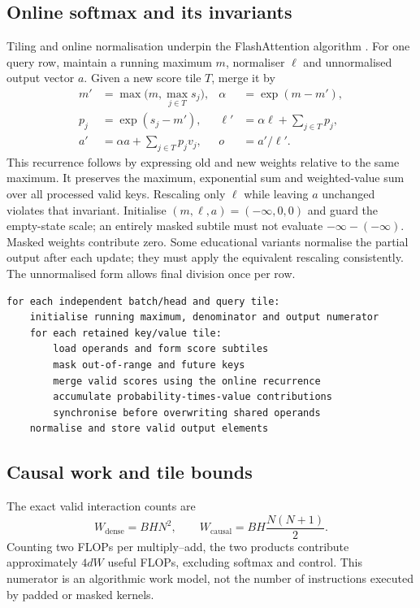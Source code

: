 \documentclass[11pt,a4paper]{article}
\begin{document}
\subsection{Online softmax and its invariants}
Tiling and online normalisation underpin the FlashAttention algorithm
\cite{flashattention,online}. For one query row, maintain a running maximum $m$,
normaliser $\ell$ and unnormalised output vector $a$. Given a new score tile
$T$, merge it by
\begin{align}
 m'&=\max\bigl(m,\max_{j\in T}s_j\bigr), &
 \alpha&=\exp(m-m'),\nonumber\\
 p_j&=\exp(s_j-m'), &
 \ell'&=\alpha\ell+\sum_{j\in T}p_j,\label{eq:online}\\
 a'&=\alpha a+\sum_{j\in T}p_jv_j, &
 o&=a'/\ell'.\nonumber
\end{align}
This recurrence follows by expressing old and new weights relative to the same
maximum. It preserves the maximum, exponential sum and weighted-value sum over
all processed valid keys. Rescaling only $\ell$ while leaving $a$ unchanged
violates that invariant. Initialise $(m,\ell,a)=(-\infty,0,0)$ and guard the
empty-state scale; an entirely masked subtile must not evaluate
$-\infty-(-\infty)$. Masked weights contribute zero. Some educational variants
normalise the partial output after each update; they must apply the equivalent
rescaling consistently. The unnormalised form allows final division once per row.

\begin{lstlisting}[caption={Conceptual fused forward pass; ownership differs by implementation.},label={lst:online}]
for each independent batch/head and query tile:
    initialise running maximum, denominator and output numerator
    for each retained key/value tile:
        load operands and form score subtiles
        mask out-of-range and future keys
        merge valid scores using the online recurrence
        accumulate probability-times-value contributions
        synchronise before overwriting shared operands
    normalise and store valid output elements
\end{lstlisting}

\subsection{Causal work and tile bounds}
The exact valid interaction counts are
\begin{equation}
 W_{\mathrm{dense}}=BHN^2,\qquad
 W_{\mathrm{causal}}=BH\frac{N(N+1)}2.
 \label{eq:pairs}
\end{equation}
Counting two FLOPs per multiply--add, the two products contribute approximately
$4dW$ useful FLOPs, excluding softmax and control. This numerator is an
algorithmic work model, not the number of instructions executed by padded or
masked kernels.
\end{document}
